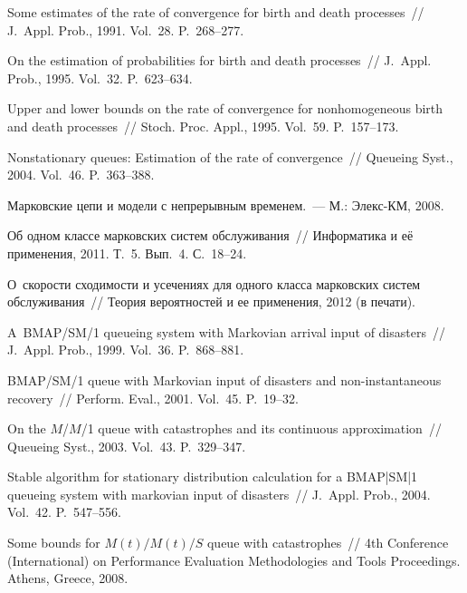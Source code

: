 \begin{multicols}{2}
{{\begin{thebibliography}{99}
  Some estimates of the rate of
convergence for birth and death processes~// J.~Appl.
Prob., 1991. Vol.~28. P.~268--277.

  On the estimation of probabilities for
birth and death processes~// J.~Appl. Prob., 1995.
Vol.~32. P.~623--634.

 Upper and lower bounds on the rate of
convergence for nonhomogeneous birth and death processes~//  Stoch.
Proc. Appl., 1995. Vol.~59. P.~157--173.

 Nonstationary queues:
Estimation of the rate of convergence~// Queueing Syst., 2004.
Vol.~46. P.~363--388.

Марковские цепи и модели с непрерывным временем.~--- М.: Элекс-КМ, 2008.

Об одном классе марковских систем обслуживания~//  Информатика и её применения, 2011. Т.~5. Вып.~4. С.~18--24.

О~ско\-рости сходимости и усечениях для одного класса марковских систем
обслуживания~//  Теория вероятностей и ее применения, 2012 (в
печати).


  A~BMAP/SM/1 queueing system with Markovian arrival input
of disasters~//
J.~Appl. Prob., 1999. Vol.~36. P.~868--881.

 BMAP/SM/1 queue with Markovian input of disasters 
and non-instantaneous recovery~//
Perform. Eval., 2001. Vol.~45. P.~19--32.

  On
the $M$/$M$/1 queue with catastrophes and its continuous approximation~// Queueing Syst., 2003. 
Vol.~43. P.~329--347.

 Stable algorithm for stationary distribution calculation 
for a BMAP|SM|1 queueing system with markovian input of disasters~// J.~Appl.
Prob.,  2004.  Vol.~42.   P.~547--556.

Some bounds for $M(t)/M(t)/S$ queue with catastrophes~// 
4th  Conference (International) on Performance Evaluation
Methodologies and Tools Proceedings.  Athens, Greece, 2008.


\end{thebibliography}}}
\end{multicols}

